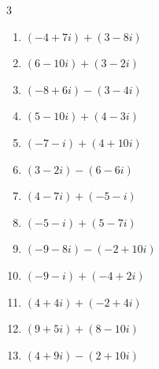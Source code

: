 \begin{multicols}{3}
\begin{enumerate}
        \phantom{$\displaystyle =-12+10i$}

  \item $\displaystyle (-4+7i) + (3-8i)$

        \phantom{$\displaystyle =-1-i$}

  \item $\displaystyle (6-10i) + (3-2i)$

        \phantom{$\displaystyle =9-12i$}

  \item $\displaystyle (-8+6i) - (3-4i)$

        \phantom{$\displaystyle =-11+10i$}

  \item $\displaystyle (5-10i) + (4-3i)$

        \phantom{$\displaystyle =9-13i$}

  \item $\displaystyle (-7-i) + (4+10i)$

        \phantom{$\displaystyle =-3+9i$}

  \item $\displaystyle (3-2i) - (6-6i)$

        \phantom{$\displaystyle =-3+4i$}

\columnbreak %

  \item $\displaystyle (4-7i) + (-5-i)$

        \phantom{$\displaystyle =-1-8i$}

  \item $\displaystyle (-5-i) + (5-7i)$

        \phantom{$\displaystyle =-8i$}

  \item $\displaystyle (-9-8i) - (-2+10i)$

        \phantom{$\displaystyle =-7-18i$}

  \item $\displaystyle (-9-i) + (-4+2i)$

        \phantom{$\displaystyle =-13+i$}

  \item $\displaystyle (4+4i) + (-2+4i)$

        \phantom{$\displaystyle =2+8i$}

  \item $\displaystyle (9+5i) + (8-10i)$

        \phantom{$\displaystyle =17-5i$}

  \item $\displaystyle (4+9i) - (2+10i)$


\end{enumerate}
\end{multicols}
